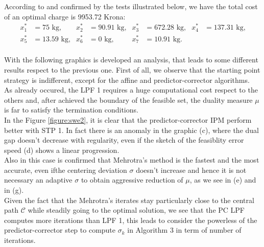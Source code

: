 \documentclass[a4paper,10 pt,titlepage,twoside]{book}
\theoremstyle{plain}
\theoremstyle{definition}
\theoremstyle{remark}
\begin{document}
According to \cite{RR} and confirmed by the tests illustrated below, we have the total cost of an optimal charge is 9953.72 Krona:
\begin{align*}
x_{1}^{*} &=  75\text{ kg,} & x_{2}^{*}&=  90.91\text{ kg,} & x_{3}^{*} &= 672.28 \text{ kg,} & x_{4}^{*} &= 137.31 \text{ kg,}\\
x_{5}^{*} &= 13.59 \text{ kg,}& x_{6}^{*}&= 0\text{ kg,}  & x_{7}^{*} &= 10.91 \text{ kg.} &&\\
\end{align*}

With the following graphics is developed an analysis, that leads to 
some different results respect to the previous one. First of all, we observe that the starting point strategy is indifferent, except for the affine and predictor-corrector algorithms.\\As already occured, the LPF 1 requires a huge computational cost respect to the others and, after achieved the boundary of the feasible set, the duality measure $\mu$ is far to satisfy the termination conditions.\\
In the Figure \ref{figure:swe2}, it is clear that the predictor-corrector IPM perform better with STP 1. In fact there is an anomaly in the graphic (c), where the dual gap doesn't decrease with regularity, even if the sketch of the feasiblity error speed (d) shows a linear progression. \\
Also in this case is confirmed that Mehrotra's method is the fastest and the most accurate, even ifthe centering deviation $\sigma$ doesn't increase and hence it is not necessary an adaptive $\sigma$ to obtain aggressive reduction of $\mu$, as we see in (e) and in (g).\\
Given the fact that the Mehrotra's iterates stay particularly close to the central path $\mathcal{C}$ while steadily going to the optimal solution, we see that the PC LPF computes more iterations than LPF 1, this leads to consider the powerless of the predictor-corrector step to compute $\sigma_{k}$ in Algorithm 3 in term of number of iterations.
\end{document}
